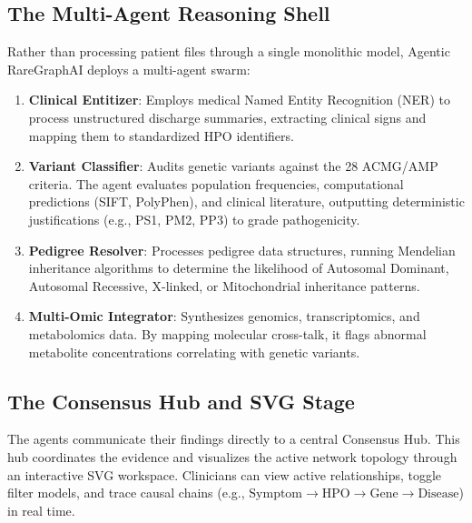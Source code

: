 \documentclass[conference]{IEEEtran}
\begin{document}
\subsection{The Multi-Agent Reasoning Shell}
Rather than processing patient files through a single monolithic model, Agentic RareGraphAI deploys a multi-agent swarm:
\begin{enumerate}
    \item \textbf{Clinical Entitizer}: Employs medical Named Entity Recognition (NER) to process unstructured discharge summaries, extracting clinical signs and mapping them to standardized HPO identifiers.
    \item \textbf{Variant Classifier}: Audits genetic variants against the 28 ACMG/AMP criteria. The agent evaluates population frequencies, computational predictions (SIFT, PolyPhen), and clinical literature, outputting deterministic justifications (e.g., PS1, PM2, PP3) to grade pathogenicity.
    \item \textbf{Pedigree Resolver}: Processes pedigree data structures, running Mendelian inheritance algorithms to determine the likelihood of Autosomal Dominant, Autosomal Recessive, X-linked, or Mitochondrial inheritance patterns.
    \item \textbf{Multi-Omic Integrator}: Synthesizes genomics, transcriptomics, and metabolomics data. By mapping molecular cross-talk, it flags abnormal metabolite concentrations correlating with genetic variants.
\end{enumerate}

\subsection{The Consensus Hub and SVG Stage}
The agents communicate their findings directly to a central Consensus Hub. This hub coordinates the evidence and visualizes the active network topology through an interactive SVG workspace. Clinicians can view active relationships, toggle filter models, and trace causal chains (e.g., $\text{Symptom} \rightarrow \text{HPO} \rightarrow \text{Gene} \rightarrow \text{Disease}$) in real time.
\end{document}
